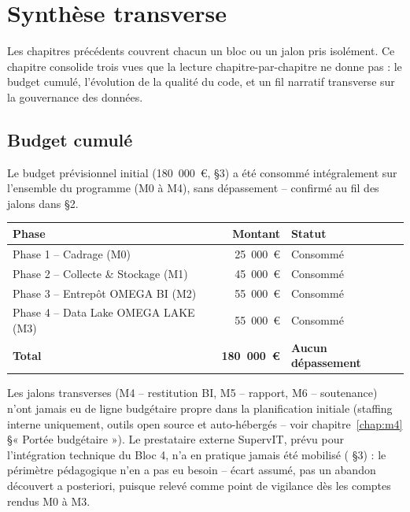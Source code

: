 \chapter{Synthèse transverse}
\label{chap:synthese-transverse}

Les chapitres précédents couvrent chacun un bloc ou un jalon pris
isolément. Ce chapitre consolide trois vues que la lecture
chapitre-par-chapitre ne donne pas : le budget cumulé, l'évolution de
la qualité du code, et un fil narratif transverse sur la gouvernance
des données.

\section{Budget cumulé}

Le budget prévisionnel initial (180~000~€,
 §3) a été consommé
intégralement sur l'ensemble du programme (M0 à M4), sans
dépassement -- confirmé au fil des jalons dans
 §2.

\begin{center}
\begin{tabular}{@{}lrl@{}}
\toprule
Phase & Montant & Statut \\
\midrule
Phase 1 -- Cadrage (M0) & 25~000~€ & Consommé \\
Phase 2 -- Collecte \& Stockage (M1) & 45~000~€ & Consommé \\
Phase 3 -- Entrepôt OMEGA BI (M2) & 55~000~€ & Consommé \\
Phase 4 -- Data Lake OMEGA LAKE (M3) & 55~000~€ & Consommé \\
\midrule
\textbf{Total} & \textbf{180~000~€} & \textbf{Aucun dépassement} \\
\bottomrule
\end{tabular}
\end{center}

Les jalons transverses (M4 -- restitution BI, M5 -- rapport, M6 --
soutenance) n'ont jamais eu de ligne budgétaire propre dans la
planification initiale (staffing interne uniquement, outils open
source et auto-hébergés -- voir chapitre~\ref{chap:m4} §« Portée
budgétaire »). Le prestataire externe SupervIT, prévu pour
l'intégration technique du Bloc 4, n'a en pratique jamais été mobilisé
( §3) : le périmètre
pédagogique n'en a pas eu besoin -- écart assumé, pas un abandon
découvert a posteriori, puisque relevé comme point de vigilance dès
les comptes rendus M0 à M3.

